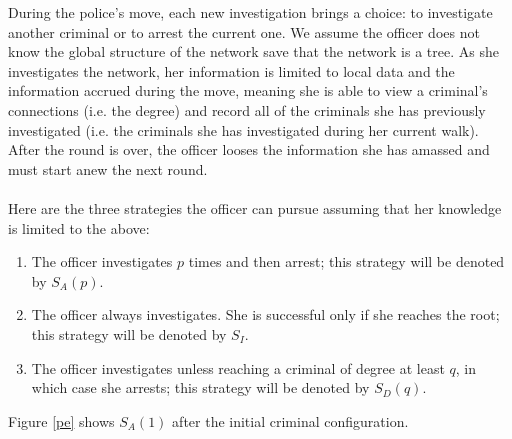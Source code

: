 \documentclass[11pt]{article}
\theoremstyle{plain}
\theoremstyle{definition}
\begin{document}
During the police's move, each new investigation brings a choice: to investigate another criminal or to arrest the current one.  We assume the officer does not know the global structure of the network save that the network is a tree.  As she investigates the network, her information is limited to local data and the information accrued during the move, meaning she is able to view a criminal's connections (i.e. the degree) and record all of the criminals she has previously investigated (i.e. the criminals she has investigated during her current walk).  After the round is over, the officer looses the information she has amassed and must start anew the next round.\\
\\
Here are the three strategies the officer can pursue assuming that her knowledge is limited to the above:
\begin{changemargin}{15mm}{15mm}
\begin{enumerate}
[label=(\arabic*)]
\item The officer investigates $p$ times and then arrest; this strategy will be denoted by $S_{A}(p)$.
\item The officer always investigates.  She is successful only if she reaches the root; this strategy will be denoted by $S_{I}$.
\item The officer investigates unless reaching a criminal of degree at least $q$, in which case she arrests; this strategy will be denoted by $S_{D}(q)$.
\end{enumerate}
\end{changemargin}
Figure \ref{pe} shows $S_A(1)$ after the initial criminal configuration.
\end{document}
